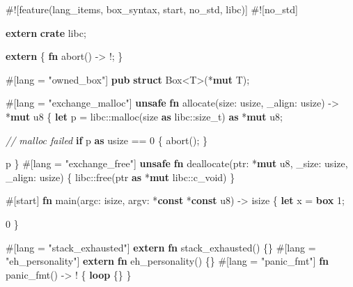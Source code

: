 \documentclass[a4paper,]{book}
\newenvironment{Shaded}{\begin{snugshade}}{\end{snugshade}}
\newcommand{\KeywordTok}[1]{\textcolor[rgb]{0.13,0.29,0.53}{\textbf{{#1}}}}
\newcommand{\DataTypeTok}[1]{\textcolor[rgb]{0.13,0.29,0.53}{{#1}}}
\newcommand{\DecValTok}[1]{\textcolor[rgb]{0.00,0.00,0.81}{{#1}}}
\newcommand{\StringTok}[1]{\textcolor[rgb]{0.31,0.60,0.02}{{#1}}}
\newcommand{\CommentTok}[1]{\textcolor[rgb]{0.56,0.35,0.01}{\textit{{#1}}}}
\newcommand{\AttributeTok}[1]{\textcolor[rgb]{0.77,0.63,0.00}{{#1}}}
\newcommand{\NormalTok}[1]{{#1}}
\begin{document}
\begin{Shaded}
\begin{Highlighting}[]
\AttributeTok{#![}\NormalTok{feature}\AttributeTok{(}\NormalTok{lang_items}\AttributeTok{,} \NormalTok{box_syntax}\AttributeTok{,} \NormalTok{start}\AttributeTok{,} \NormalTok{no_std}\AttributeTok{,} \NormalTok{libc}\AttributeTok{)]}
\AttributeTok{#![}\NormalTok{no_std}\AttributeTok{]}

\KeywordTok{extern} \KeywordTok{crate} \NormalTok{libc;}

\KeywordTok{extern} \NormalTok{\{}
    \KeywordTok{fn} \NormalTok{abort() -> !;}
\NormalTok{\}}

\AttributeTok{#[}\NormalTok{lang }\AttributeTok{=} \StringTok{"owned_box"}\AttributeTok{]}
\KeywordTok{pub} \KeywordTok{struct} \DataTypeTok{Box}\NormalTok{<T>(*}\KeywordTok{mut} \NormalTok{T);}

\AttributeTok{#[}\NormalTok{lang }\AttributeTok{=} \StringTok{"exchange_malloc"}\AttributeTok{]}
\KeywordTok{unsafe} \KeywordTok{fn} \NormalTok{allocate(size: }\DataTypeTok{usize}\NormalTok{, _align: }\DataTypeTok{usize}\NormalTok{) -> *}\KeywordTok{mut} \DataTypeTok{u8} \NormalTok{\{}
    \KeywordTok{let} \NormalTok{p = libc::malloc(size }\KeywordTok{as} \NormalTok{libc::}\DataTypeTok{size_t}\NormalTok{) }\KeywordTok{as} \NormalTok{*}\KeywordTok{mut} \DataTypeTok{u8}\NormalTok{;}

    \CommentTok{// malloc failed}
    \KeywordTok{if} \NormalTok{p }\KeywordTok{as} \DataTypeTok{usize} \NormalTok{== }\DecValTok{0} \NormalTok{\{}
        \NormalTok{abort();}
    \NormalTok{\}}

    \NormalTok{p}
\NormalTok{\}}
\AttributeTok{#[}\NormalTok{lang }\AttributeTok{=} \StringTok{"exchange_free"}\AttributeTok{]}
\KeywordTok{unsafe} \KeywordTok{fn} \NormalTok{deallocate(ptr: *}\KeywordTok{mut} \DataTypeTok{u8}\NormalTok{, _size: }\DataTypeTok{usize}\NormalTok{, _align: }\DataTypeTok{usize}\NormalTok{) \{}
    \NormalTok{libc::free(ptr }\KeywordTok{as} \NormalTok{*}\KeywordTok{mut} \NormalTok{libc::}\DataTypeTok{c_void}\NormalTok{)}
\NormalTok{\}}

\AttributeTok{#[}\NormalTok{start}\AttributeTok{]}
\KeywordTok{fn} \NormalTok{main(argc: }\DataTypeTok{isize}\NormalTok{, argv: *}\KeywordTok{const} \NormalTok{*}\KeywordTok{const} \DataTypeTok{u8}\NormalTok{) -> }\DataTypeTok{isize} \NormalTok{\{}
    \KeywordTok{let} \NormalTok{x = }\KeywordTok{box} \DecValTok{1}\NormalTok{;}

    \DecValTok{0}
\NormalTok{\}}

\AttributeTok{#[}\NormalTok{lang }\AttributeTok{=} \StringTok{"stack_exhausted"}\AttributeTok{]} \KeywordTok{extern} \KeywordTok{fn} \NormalTok{stack_exhausted() \{\}}
\AttributeTok{#[}\NormalTok{lang }\AttributeTok{=} \StringTok{"eh_personality"}\AttributeTok{]} \KeywordTok{extern} \KeywordTok{fn} \NormalTok{eh_personality() \{\}}
\AttributeTok{#[}\NormalTok{lang }\AttributeTok{=} \StringTok{"panic_fmt"}\AttributeTok{]} \KeywordTok{fn} \NormalTok{panic_fmt() -> ! \{ }\KeywordTok{loop} \NormalTok{\{\} \}}
\end{Highlighting}
\end{Shaded}
\end{document}
